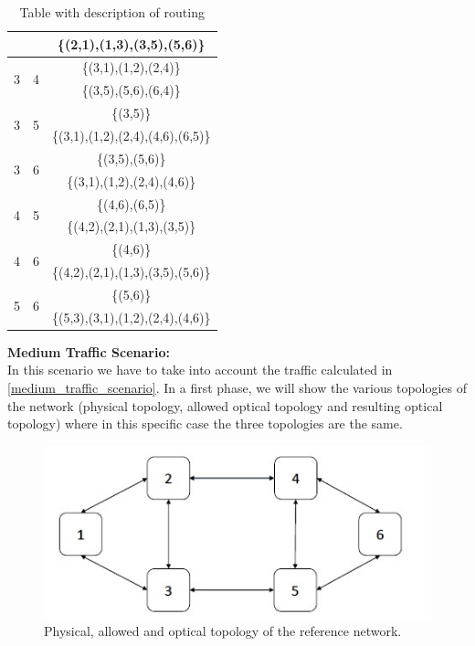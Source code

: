 \begin{table}[h!]
\begin{tabular}{|| c | c | c ||}
 & & \{(2,1),(1,3),(3,5),(5,6)\} \\ \hline
 \multirow{2}{*}{3} & \multirow{2}{*}{4} & \{(3,1),(1,2),(2,4)\}\\
 & & \{(3,5),(5,6),(6,4)\} \\ \hline
 \multirow{2}{*}{3} & \multirow{2}{*}{5} & \{(3,5)\}\\
 & & \{(3,1),(1,2),(2,4),(4,6),(6,5)\} \\ \hline
 \multirow{2}{*}{3} & \multirow{2}{*}{6} & \{(3,5),(5,6)\}\\
 & & \{(3,1),(1,2),(2,4),(4,6)\} \\ \hline
 \multirow{2}{*}{4} & \multirow{2}{*}{5} & \{(4,6),(6,5)\}\\
 & & \{(4,2),(2,1),(1,3),(3,5)\} \\ \hline
 \multirow{2}{*}{4} & \multirow{2}{*}{6} & \{(4,6)\}\\
 & & \{(4,2),(2,1),(1,3),(3,5),(5,6)\} \\ \hline
 \multirow{2}{*}{5} & \multirow{2}{*}{6} & \{(5,6)\}\\
 & & \{(5,3),(3,1),(1,2),(2,4),(4,6)\} \\
 \hline
\end{tabular}
\caption{Table with description of routing}
\label{path_opaque_protec_ref_low}
\end{table}


\newpage
\textbf{Medium Traffic Scenario:}\\

In this scenario we have to take into account the traffic calculated in \ref{medium_traffic_scenario}. In a first phase, we will show the various topologies of the network (physical topology, allowed optical topology and resulting optical topology) where in this specific case the three topologies are the same.\\

\begin{figure}[h!]
\centering
\includegraphics[width=13cm]{sdf/ilp/opaque_protection/figures/physical_opaque_protec_ref_low}
\caption{Physical, allowed and optical topology of the reference network.}
\label{physical_protec_ref_medium}
\end{figure}


